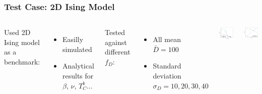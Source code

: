 \documentclass{beamer}
\begin{document}
\begin{frame}
	\frametitle{Test Case: 2D Ising Model}
	\begin{columns}
	\column{7cm}
		Used 2D Ising model as a benchmark:
		\begin{itemize}
			\item{Easilly simulated}
			\item{Analytical results for $\beta$, $\nu$, $T_C^b$...}
		\end{itemize} \vspace{4mm}
		
		Tested against different $f_D$:
		\begin{itemize}
			\item{All mean $\bar{D}=100$}
			\item{Standard deviation $\sigma_D=10, 20, 30 ,40$}
		\end{itemize}
	\column{5cm}
		\includegraphics[width=4.5cm]{Images/distros}
		
		\includegraphics[width=4.5cm]{Images/unconst}
	\end{columns}
\end{frame}
\end{document}

